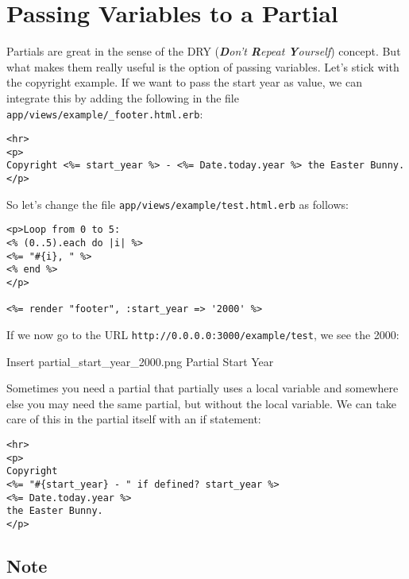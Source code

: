 \documentclass[a4paper]{book}
\begin{document}
\section{Passing Variables to a Partial}\label{passing-variables-to-a-partial}

Partials are great in the sense of the DRY (\emph{\textbf{D}on't \textbf{R}epeat \textbf{Y}ourself}) concept. But what makes them really useful is the option of passing variables. Let's stick with the copyright example. If we want to pass the start year as value, we can integrate this by adding the following in the file \texttt{app/views/example/\_footer.html.erb}:

\begin{shaded}\begin{verbatim}
<hr>
<p>
Copyright <%= start_year %> - <%= Date.today.year %> the Easter Bunny.
</p>
\end{verbatim}\end{shaded}

So let's change the file \texttt{app/views/example/test.html.erb} as follows:

\begin{shaded}\begin{verbatim}
<p>Loop from 0 to 5:
<% (0..5).each do |i| %>
<%= "#{i}, " %>
<% end %>
</p>

<%= render "footer", :start_year => '2000' %>
\end{verbatim}\end{shaded}

If we now go to the URL \texttt{http://0.0.0.0:3000/example/test}, we see the 2000:

Insert partial\_start\_year\_2000.png Partial Start Year

Sometimes you need a partial that partially uses a local variable and somewhere else you may need the same partial, but without the local variable. We can take care of this in the partial itself with an if statement:

\begin{shaded}\begin{verbatim}
<hr>
<p>
Copyright
<%= "#{start_year} - " if defined? start_year %>
<%= Date.today.year %>
the Easter Bunny.
</p>
\end{verbatim}\end{shaded}

\subsection{Note}\label{note-17}
\end{document}
